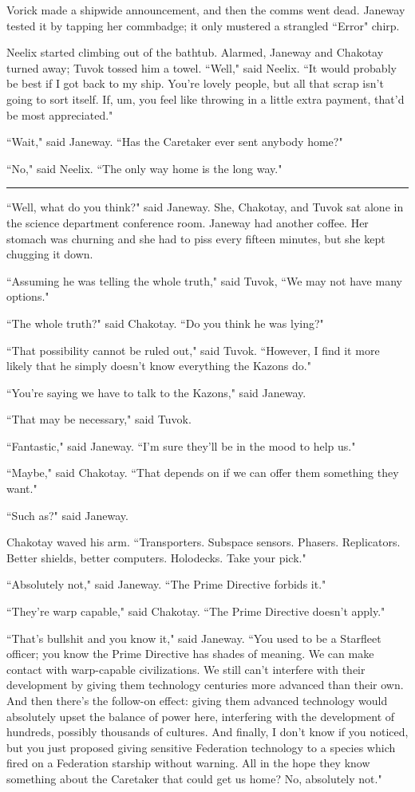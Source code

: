 \documentclass[twoside,letterpaper,12pt]{memoir}
\begin{document}
Vorick made a shipwide announcement, and then the comms went dead. Janeway tested it by tapping her commbadge; it only mustered a strangled ``Error" chirp.

Neelix started climbing out of the bathtub. Alarmed, Janeway and Chakotay turned away; Tuvok tossed him a towel. ``Well," said Neelix. ``It would probably be best if I got back to my ship. You're lovely people, but all that scrap isn't going to sort itself. If, um, you feel like throwing in a little extra payment, that'd be most appreciated."

``Wait," said Janeway. ``Has the Caretaker ever sent anybody home?"

``No," said Neelix. ``The only way home is the long way."

\begin{center}\rule{3cm}{0.4 pt}\end{center}

``Well, what do you think?" said Janeway. She, Chakotay, and Tuvok sat alone in the science department conference room. Janeway had another coffee. Her stomach was churning and she had to piss every fifteen minutes, but she kept chugging it down.

``Assuming he was telling the whole truth," said Tuvok, ``We may not have many options."

``The whole truth?" said Chakotay. ``Do you think he was lying?"

``That possibility cannot be ruled out," said Tuvok. ``However, I find it more likely that he simply doesn't know everything the Kazons do."

``You're saying we have to talk to the Kazons," said Janeway.

``That may be necessary," said Tuvok.

``Fantastic," said Janeway. ``I'm sure they'll be in the mood to help us."

``Maybe," said Chakotay. ``That depends on if we can offer them something they want."

``Such as?" said Janeway.

Chakotay waved his arm. ``Transporters. Subspace sensors. Phasers. Replicators. Better shields, better computers. Holodecks. Take your pick."

``Absolutely not," said Janeway. ``The Prime Directive forbids it."

``They're warp capable," said Chakotay. ``The Prime Directive doesn't apply."

``That's bullshit and you know it," said Janeway. ``You used to be a Starfleet officer; you know the Prime Directive has shades of meaning. We can make contact with warp-capable civilizations. We still can't interfere with their development by giving them technology centuries more advanced than their own. And then there's the follow-on effect: giving them advanced technology would absolutely upset the balance of power here, interfering with the development of hundreds, possibly thousands of cultures. And finally, I don't know if you noticed, but you just proposed giving sensitive Federation technology to a species which fired on a Federation starship without warning. All in the hope they know something about the Caretaker that could get us home? No, absolutely not."
\end{document}
